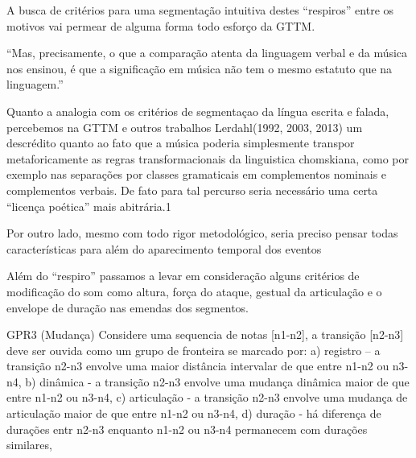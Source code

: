 \documentclass[
	12pt,				%
	openright,			%
	twoside,			%
	a4paper,			%
	english,			%
	french,				%
	spanish,			%
	brazil				%
	]{abntex2}
\begin{document}
A busca de critérios para uma segmentação intuitiva destes “respiros” entre os motivos vai permear de alguma forma todo esforço da GTTM. 

\begin{citacao}
“Mas, precisamente, o que a comparação atenta da linguagem verbal e da música nos ensinou, é que a significação em música não tem o mesmo estatuto que na linguagem.”\cite[ p.9]{nattiez2004modelos}
\end{citacao}

Quanto a analogia com os critérios de segmentaçao da língua escrita e falada, percebemos na GTTM e outros trabalhos Lerdahl(1992, 2003, 2013) um descrédito quanto ao fato que a música poderia simplesmente transpor metaforicamente as regras transformacionais da linguistica chomskiana, como por exemplo nas separações por classes gramaticais em complementos nominais e complementos verbais.  De fato para tal percurso seria necessário uma certa “licença poética” mais abitrária.1

Por outro lado, mesmo com todo rigor metodológico, seria preciso pensar todas características para além do aparecimento temporal dos eventos

Além do “respiro” passamos a levar em consideração alguns critérios de modificação do som como altura, força do ataque, gestual da articulação e o envelope de duração nas emendas dos segmentos.

\begin{citacao}
GPR3 (Mudança) Considere uma sequencia de notas [n1-n2], a transição [n2-n3] deve ser ouvida como um grupo de fronteira se marcado por:
a) registro – a transição n2-n3 envolve uma maior distância intervalar de que entre n1-n2 ou n3-n4,\linebreak
b) dinâmica - a transição n2-n3 envolve uma mudança dinâmica maior de que entre n1-n2 ou n3-n4,\linebreak
c) articulação - a transição n2-n3 envolve uma mudança de articulação maior de que entre n1-n2 ou n3-n4,\linebreak
d) duração - há diferença de durações  entr n2-n3 enquanto n1-n2 ou n3-n4 permanecem com durações similares,
\cite{lerdahl1983generative}
\end{citacao}
\end{document}
